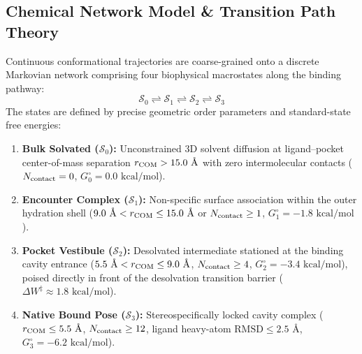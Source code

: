 \documentclass[journal=jpcbfk,manuscript=article]{achemso}
\begin{document}
\subsection{Chemical Network Model \& Transition Path Theory}
Continuous conformational trajectories are coarse-grained onto a discrete Markovian network comprising four biophysical macrostates along the binding pathway:
\begin{equation}
\mathcal{S}_0 \rightleftharpoons \mathcal{S}_1 \rightleftharpoons \mathcal{S}_2 \rightleftharpoons \mathcal{S}_3
\end{equation}
The states are defined by precise geometric order parameters and standard-state free energies:
\begin{enumerate}
\item \textbf{Bulk Solvated ($\mathcal{S}_0$):} Unconstrained 3D solvent diffusion at ligand--pocket center-of-mass separation $r_{\rm COM} > 15.0\text{ \AA}$ with zero intermolecular contacts ($N_{\rm contact} = 0$, $G_0^\circ = 0.0\text{ kcal/mol}$).
\item \textbf{Encounter Complex ($\mathcal{S}_1$):} Non-specific surface association within the outer hydration shell ($9.0\text{ \AA} < r_{\rm COM} \le 15.0\text{ \AA}$ or $N_{\rm contact} \ge 1$, $G_1^\circ = -1.8\text{ kcal/mol}$).
\item \textbf{Pocket Vestibule ($\mathcal{S}_2$):} Desolvated intermediate stationed at the binding cavity entrance ($5.5\text{ \AA} < r_{\rm COM} \le 9.0\text{ \AA}$, $N_{\rm contact} \ge 4$, $G_2^\circ = -3.4\text{ kcal/mol}$), poised directly in front of the desolvation transition barrier ($\Delta W^\ddagger \approx 1.8\text{ kcal/mol}$).
\item \textbf{Native Bound Pose ($\mathcal{S}_3$):} Stereospecifically locked cavity complex ($r_{\rm COM} \le 5.5\text{ \AA}$, $N_{\rm contact} \ge 12$, ligand heavy-atom $\text{RMSD} \le 2.5\text{ \AA}$, $G_3^\circ = -6.2\text{ kcal/mol}$).
\end{enumerate}
\end{document}
